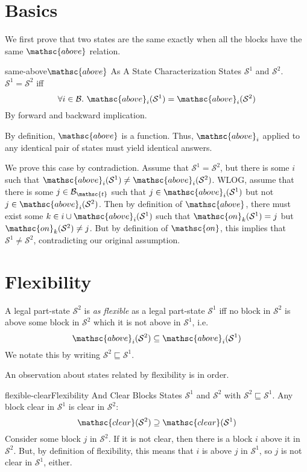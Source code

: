 \documentclass{article}
\newcommand{\have}{{.~}}
\newcommand{\bstate}{{\mathcal{S}}}
\newcommand{\blocks}{{\mathcal{B}}}
\newcommand{\tabtop}{{\mathsc{t}}}
\newcommand{\tblocks}{{\blocks_\tabtop}}
\newcommand{\bclear}{{\mathsc{clear}}}
\newcommand{\bon}{{\mathsc{on}}}
\newcommand{\babove}{{\mathsc{above}}}
\begin{document}
\section{Basics}

We first prove that two states are the same exactly when
all the blocks have the same $\babove$ relation.
\begin{lemma}{same-above}{$\babove$ As A State Characterization}
\given
States $\bstate^1$ and $\bstate^2$.
\prove
$\bstate^1 = \bstate^2$ iff $$
  \forall i \in \blocks \have
    \babove_i(\bstate^1) = \babove_i(\bstate^2)
$$
\proof  By forward and backward implication.

\forwardcase
By definition, $\babove$ is a function.  Thus, 
$\babove_i$ applied to any identical pair of states
must yield identical answers.

\backwardcase
We prove this case by contradiction.
Assume that $\bstate^1 = \bstate^2$, but there is some $i$ such that
$\babove_i(\bstate^1) \not= \babove_i(\bstate^2)$.
WLOG, assume that 
there is some $j \in \tblocks$
such that $j \in \babove_i(\bstate^1)$ but not $j \in \babove_i(\bstate^2)$.
Then by definition of $\babove$, there must exist some
$k \in i \cup \babove_i(\bstate^1)$
such that $\bon_k(\bstate^1) = j$ but $\bon_k(\bstate^2) \not= j$.
But by definition of $\bon$, this implies that $\bstate^1 \not= \bstate^2$,
contradicting our original assumption.
\end{lemma}

\section{Flexibility}

A legal part-state $\bstate^2$ is {\em as flexible} as
a legal part-state $\bstate^1$ iff no block in $\bstate^2$
is above some block in $\bstate^2$ which it is not above in
$\bstate^1$, i.e. $$
  \babove_i (\bstate^2) \subseteq \babove_i(\bstate^1)
$$
We notate this by writing $\bstate^2 \sqsubseteq \bstate^1$.

An observation about states related by flexibility is in order.
\begin{lemma}{flexible-clear}{Flexibility And Clear Blocks}
\given
States $\bstate^1$ and $\bstate^2$ with $\bstate^2 \sqsubseteq \bstate^1$.
\prove
Any block clear in $\bstate^1$ is clear in $\bstate^2$: $$
  \bclear(\bstate^2) \supseteq \bclear(\bstate^1)
$$
\proof
Consider some block $j$ in $\bstate^2$.  If it is not clear,
then there is a block $i$ above it in $\bstate^2$.  But,
by definition of flexibility, this means that $i$ is above $j$
in $\bstate^1$, so $j$ is not clear in $\bstate^1$, either.
\end{lemma}
\end{document}
